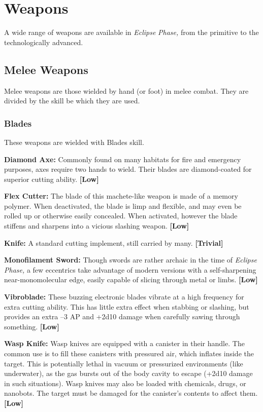 \section{Weapons}

A wide range of weapons are available in \textit{Eclipse }
\textit{Phase,} from the primitive to the technologically 
advanced.

\subsection{Melee Weapons}

Melee weapons are those wielded by hand (or foot) in 
melee combat. They are divided by the skill be which 
they are used.

\subsubsection{Blades}

These weapons are wielded with Blades skill.

\textbf{Diamond Axe:} Commonly found on many habitats 
for fire and emergency purposes, axes require two 
hands to wield. Their blades are diamond-coated for 
superior cutting ability. \textbf{[Low]}

\textbf{Flex Cutter:} The blade of this machete-like weapon 
is made of a memory polymer. When deactivated, the 
blade is limp and flexible, and may even be rolled up 
or otherwise easily concealed. When activated, however
the blade stiffens and sharpens into a vicious
slashing weapon. \textbf{[Low]}

\textbf{Knife:} A standard cutting implement, still carried 
by many. \textbf{[Trivial]}

\textbf{Monofilament  Sword:} Though swords are rather 
archaic in the time of \textit{Eclipse Phase,} a few eccentrics 
take advantage of modern versions with a self-sharpening
near-monomolecular edge, easily capable
of slicing through metal or limbs. \textbf{[Low]}

\textbf{Vibroblade:} These buzzing electronic blades vibrate 
at a high frequency for extra cutting ability. This 
has little extra effect when stabbing or slashing, but 
provides an extra –3 AP and +2d10 damage when 
carefully sawing through something. \textbf{[Low]}

\textbf{Wasp Knife:} Wasp knives are equipped with a canister
in their handle. The common use is to fill these
canisters with pressured air, which inflates  inside 
the target. This is potentially lethal in vacuum or 
pressurized environments (like underwater), as the 
gas bursts out of the body cavity to escape (+2d10 
damage in such situations). Wasp knives may also 
be loaded with chemicals, drugs, or nanobots. The 
target must be damaged for the canister's contents to 
affect them. \textbf{[Low]}

